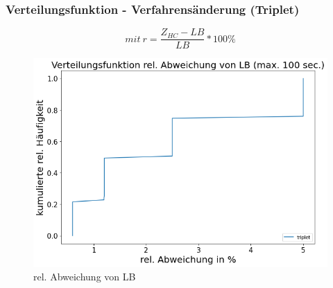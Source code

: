 \documentclass{beamer}
\begin{document}
\begin{frame}

\frametitle{Verteilungsfunktion - Verfahrensänderung (Triplet)}

\begin{footnotesize}
\begin{equation}
mit \ r = \frac{Z_{HC}-LB}{LB} * 100\%
\end{equation}
\end{footnotesize}

\begin{figure}[!htbp]
\begin{center}
\includegraphics[scale=0.3]{img/dist7.png}
\end{center}
\caption{rel. Abweichung von LB}
\label{fig:architecture}
\end{figure}



\end{frame}
%
%
%
\end{document}
